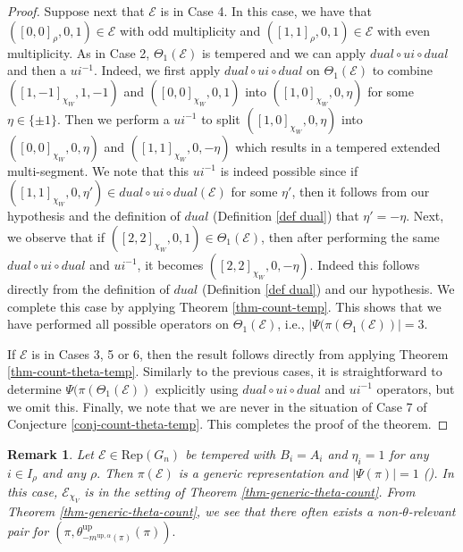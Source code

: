 \documentclass[11pt,letterpaper]{amsart}
\newcommand{\Rep}{{\mathrm{Rep}}}
\newcommand{\up}{{\mathrm{up}}}
\newcommand{\EE}{\mathcal{E}}
\newtheorem{rmk}[thm]{Remark}
\numberwithin{equation}{section}
\begin{document}
\begin{proof}
Suppose next that $\EE$ is in Case 4. In this case, we have that $([0,0]_{\rho},0,1)\in\EE$ with odd multiplicity and $([1,1]_{\rho},0,1)\in\EE$ with even multiplicity. As in Case 2, $\Theta_1(\EE)$ is tempered and we can apply $dual\circ ui \circ dual$ and then a $ui^{-1}.$ Indeed, we first apply $dual\circ ui \circ dual$ on $\Theta_1(\EE)$ to combine $([1,-1]_{\chi_W},1,-1)$ and $([0,0]_{\chi_W},0,1)$ into $([1,0]_{\chi_W},0,\eta)$ for some $\eta\in\{\pm1\}$. Then we perform a $ui^{-1}$ to split $([1,0]_{\chi_W},0,\eta)$ into $([0,0]_{\chi_W},0,\eta)$ and $([1,1]_{\chi_W},0,-\eta)$ which results in a tempered extended multi-segment. We note that this $ui^{-1}$ is indeed possible since if $([1,1]_{\chi_W},0,\eta')\in dual\circ ui \circ dual(\EE)$ for some $\eta'$, then it follows from our hypothesis and the definition of $dual$ (Definition \ref{def dual}) that $\eta'=-\eta$. Next, we observe that if $([2,2]_{\chi_W},0,1)\in\Theta_1(\EE)$, then after performing the same $dual\circ ui\circ dual$ and $ui^{-1}$, it becomes $([2,2]_{\chi_W},0,-\eta)$. Indeed this follows directly from the definition of $dual$ (Definition \ref{def dual}) and our hypothesis.
We complete this case by applying Theorem \ref{thm-count-temp}. This shows that we have performed all possible operators on $\Theta_1(\EE)$, i.e., $|\Psi(\pi(\Theta_1(\EE))|=3$.





If $\EE$ is in Cases 3, 5 or 6, then the result follows directly from applying Theorem \ref{thm-count-theta-temp}. Similarly to the previous cases, it is straightforward to determine $\Psi(\pi(\Theta_1(\EE))$ explicitly using $dual\circ ui \circ dual$ and $ui^{-1}$ operators, but we omit this.
Finally, we note that we are never in the situation of Case 7 of Conjecture \ref{conj-count-theta-temp}. This completes the proof of the theorem.
\end{proof}



\begin{rmk}\label{rmk generic}
    Let $\EE\in\Rep(G_n)$ be tempered with $B_i=A_i$ and $\eta_i=1$ for any $i\in I_\rho$ and any $\rho.$ Then $\pi(\EE)$ is a generic representation and $|\Psi(\pi)|=1$ (\cite[Theorem 1.2]{HLL24}). In this case, $\EE_{\chi_V}$ is in the setting of Theorem \ref{thm-generic-theta-count}. From Theorem \ref{thm-generic-theta-count}, we see that there often exists a non-$\theta$-relevant pair for $(\pi,\theta_{-m^{\up,\alpha}(\pi)}^\up(\pi)).$
\end{rmk}
\end{document}
